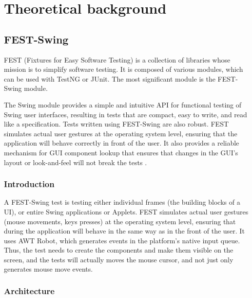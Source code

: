 
\chapter{Theoretical background}\label{chap:theory}

\section{FEST-Swing}\label{sec:fest-swing}

FEST (Fixtures for Easy Software Testing) is a collection of libraries whose mission is to simplify software testing. It is composed of various modules, which can be used with TestNG or JUnit. The most significant module is the FEST-Swing module.

The Swing module provides a simple and intuitive API for functional testing of Swing user interfaces, resulting in tests that are compact, easy to write, and read like a specification. Tests written using FEST-Swing are also robust. FEST simulates actual user gestures at the operating system level, ensuring that the application will behave correctly in front of the user. It also provides a reliable mechanism for GUI component lookup that ensures that changes in the GUI's layout or look-and-feel will not break the tests \cite{FESTMain}.

\subsection{Introduction}

A FEST-Swing test is testing either individual frames (the building blocks of a UI), or entire Swing applications or Applets. FEST simulates actual user gestures (mouse movements, keys presses) at the operating system level, ensuring that during the application will behave in the same way as in the front of the user. It uses AWT Robot, which generates events in the platform's native input queue. Thus, the test needs to create the components and make them visible on the screen, and the tests will actually moves the mouse cursor, and not just only generates mouse move events.

\subsection{Architecture}

